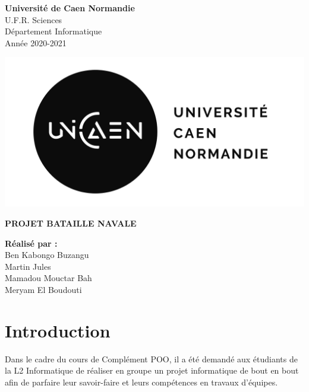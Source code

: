 \documentclass[a4paper, 12pt]{report}
\begin{document}
    \hypersetup{pdfborder=0 0 0}

    \setcounter{page}{0}

    \begin{minipage}{0.6\linewidth}
        \textbf{Université de Caen Normandie}\\
        U.F.R. Sciences \\
        Département Informatique\\
        Année 2020-2021
    \end{minipage}

    \begin{minipage}{0.5\linewidth}
        \begin{flushright}
            \includegraphics[scale=1.2]{images/logo.png}
        \end{flushright}
    \end{minipage}

    \vspace{5cm}

    \begin{center}
        \huge \textbf{PROJET BATAILLE NAVALE}\\
    \end{center}

    \vspace{2cm}

    \textbf{Réalisé par :} \\
    Ben Kabongo Buzangu\\
    Martin Jules\\
    Mamadou Mouctar Bah\\
    Meryam El Boudouti\\

    \newpage
    \chapter*{Introduction}
    Dans le cadre du cours de Complément POO, il a été demandé aux étudiants de la L2 Informatique de réaliser en groupe
    un projet informatique de bout en bout afin de parfaire leur savoir-faire et leurs compétences en travaux d'équipes.
\end{document}
